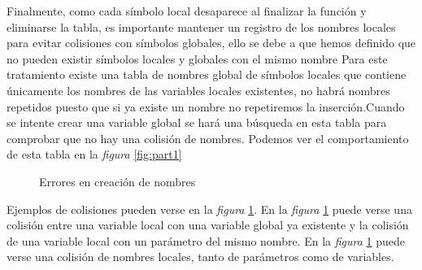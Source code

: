 \documentclass[a4paper,10pt]{article}
\begin{document}
Finalmente, como cada símbolo local desaparece al finalizar la función y eliminarse la tabla, es importante mantener un registro de los nombres locales para evitar colisiones con símbolos globales, ello se debe a que hemos definido que no pueden existir símbolos locales y globales con el mismo nombre Para este tratamiento existe una tabla de nombres global de símbolos locales que contiene únicamente los nombres de las variables locales existentes, no habrá nombres repetidos puesto que si ya existe un nombre no repetiremos la inserción.Cuando se intente crear una variable global se hará una búsqueda en esta tabla para comprobar que no hay una colisión de nombres. Podemos ver el comportamiento de esta tabla en la \emph{figura} \ref{fig:part1} 

\begin{figure}[H]
  \centering
  \hspace{11mm}
  \caption{Errores en creación de nombres}
  \label{fig:part3}
\end{figure}

Ejemplos de colisiones pueden verse en la \emph{figura} \ref{fig:part3}. En la \emph{figura} \ref{fig:part3} puede verse una colisión entre una variable local con una variable global ya existente y la colisión de una variable local con un parámetro del mismo nombre. En la \emph{figura} \ref{fig:part3} puede verse una colisión de nombres locales, tanto de parámetros como de variables.
\end{document}
